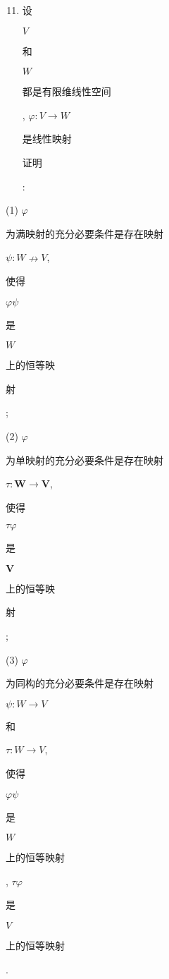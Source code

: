 \documentclass[10pt]{article}
\begin{document}
\begin{enumerate}
  \setcounter{enumi}{10}
  \item \begin{CJK}{UTF8}{mj}设\end{CJK} $V$ \begin{CJK}{UTF8}{mj}和\end{CJK} $W$ \begin{CJK}{UTF8}{mj}都是有限维线性空间\end{CJK}, $\varphi: V \rightarrow W$ \begin{CJK}{UTF8}{mj}是线性映射\end{CJK} \begin{CJK}{UTF8}{mj}证明\end{CJK}:
\end{enumerate}
(1) $\varphi$ \begin{CJK}{UTF8}{mj}为满映射的充分必要条件是存在映射\end{CJK} $\psi: W \nrightarrow V$, \begin{CJK}{UTF8}{mj}使得\end{CJK} $\varphi \psi$ \begin{CJK}{UTF8}{mj}是\end{CJK} $W$ \begin{CJK}{UTF8}{mj}上的恒等映\end{CJK} \begin{CJK}{UTF8}{mj}射\end{CJK};

(2) $\varphi$ \begin{CJK}{UTF8}{mj}为单映射的充分必要条件是存在映射\end{CJK} $\tau: \boldsymbol{W} \rightarrow \boldsymbol{V}$, \begin{CJK}{UTF8}{mj}使得\end{CJK} $\tau \varphi$ \begin{CJK}{UTF8}{mj}是\end{CJK} $\boldsymbol{V}$ \begin{CJK}{UTF8}{mj}上的恒等映\end{CJK} \begin{CJK}{UTF8}{mj}射\end{CJK};

(3) $\varphi$ \begin{CJK}{UTF8}{mj}为同构的充分必要条件是存在映射\end{CJK} $\psi: W \rightarrow V$ \begin{CJK}{UTF8}{mj}和\end{CJK} $\tau: W \rightarrow V$, \begin{CJK}{UTF8}{mj}使得\end{CJK} $\varphi \psi$ \begin{CJK}{UTF8}{mj}是\end{CJK} $W$ \begin{CJK}{UTF8}{mj}上的恒等映射\end{CJK}, $\tau \varphi$ \begin{CJK}{UTF8}{mj}是\end{CJK} $V$ \begin{CJK}{UTF8}{mj}上的恒等映射\end{CJK}.
\end{document}
